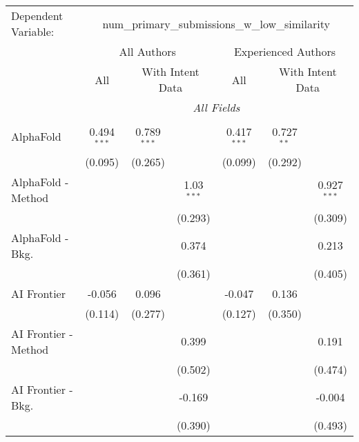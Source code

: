 \begingroup
\centering
\begin{tabular}{lcccccc}
   \tabularnewline \midrule \midrule
   Dependent Variable: & \multicolumn{6}{c}{num\_primary\_submissions\_w\_low\_similarity}\\
 & \multicolumn{3}{c}{All Authors} & \multicolumn{3}{c}{Experienced Authors} \\
\cmidrule(lr){2-4} \cmidrule(lr){5-7}
 & \multicolumn{1}{c}{All} & \multicolumn{2}{c}{With Intent Data} & \multicolumn{1}{c}{All} & \multicolumn{2}{c}{With Intent Data} \\
\cmidrule(lr){2-2} \cmidrule(lr){3-4} \cmidrule(lr){5-5} \cmidrule(lr){6-7}
 & \multicolumn{6}{c}{\textit{All Fields}} \\ \\
   AlphaFold            & 0.494$^{***}$ & 0.789$^{***}$ &              & 0.417$^{***}$ & 0.727$^{**}$ &   \\   
                        & (0.095)       & (0.265)       &              & (0.099)       & (0.292)      &   \\   
   AlphaFold - Method   &               &               & 1.03$^{***}$ &               &              & 0.927$^{***}$\\   
                        &               &               & (0.293)      &               &              & (0.309)\\   
   AlphaFold - Bkg.     &               &               & 0.374        &               &              & 0.213\\   
                        &               &               & (0.361)      &               &              & (0.405)\\   
   AI Frontier          & -0.056        & 0.096         &              & -0.047        & 0.136        &   \\   
                        & (0.114)       & (0.277)       &              & (0.127)       & (0.350)      &   \\   
   AI Frontier - Method &               &               & 0.399        &               &              & 0.191\\   
                        &               &               & (0.502)      &               &              & (0.474)\\   
   AI Frontier - Bkg.   &               &               & -0.169       &               &              & -0.004\\   
                        &               &               & (0.390)      &               &              & (0.493)\\   

\end{tabular}
